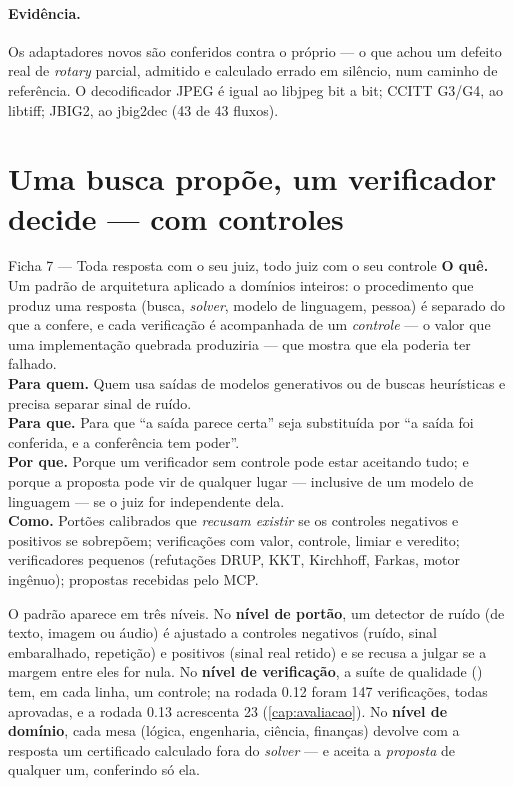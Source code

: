 \paragraph{Evidência.} Os adaptadores novos são conferidos contra o próprio  --- o que achou um defeito real de \textit{rotary} parcial, admitido e calculado errado em silêncio, num caminho de referência. O decodificador JPEG é igual ao libjpeg bit a bit; CCITT G3/G4, ao libtiff; JBIG2, ao jbig2dec (43 de 43 fluxos).

\section{Uma busca propõe, um verificador decide --- com controles}\label{sec:inov-proponente}

\begin{ficha}{Ficha 7 --- Toda resposta com o seu juiz, todo juiz com o seu controle}
\textbf{O quê.} Um padrão de arquitetura aplicado a domínios inteiros: o procedimento que produz uma resposta (busca, \textit{solver}, modelo de linguagem, pessoa) é separado do que a confere, e cada verificação é acompanhada de um \emph{controle} --- o valor que uma implementação quebrada produziria --- que mostra que ela poderia ter falhado.\\
\textbf{Para quem.} Quem usa saídas de modelos generativos ou de buscas heurísticas e precisa separar sinal de ruído.\\
\textbf{Para que.} Para que ``a saída parece certa'' seja substituída por ``a saída foi conferida, e a conferência tem poder''.\\
\textbf{Por que.} Porque um verificador sem controle pode estar aceitando tudo; e porque a proposta pode vir de qualquer lugar --- inclusive de um modelo de linguagem --- se o juiz for independente dela.\\
\textbf{Como.} Portões calibrados que \emph{recusam existir} se os controles negativos e positivos se sobrepõem; verificações com valor, controle, limiar e veredito; verificadores pequenos (refutações DRUP, KKT, Kirchhoff, Farkas, motor ingênuo); propostas recebidas pelo MCP.
\end{ficha}

O padrão aparece em três níveis. No \textbf{nível de portão}, um detector de ruído (de texto, imagem ou áudio) é ajustado a controles negativos (ruído, sinal embaralhado, repetição) e positivos (sinal real retido) e se recusa a julgar se a margem entre eles for nula. No \textbf{nível de verificação}, a suíte de qualidade () tem, em cada linha, um controle; na rodada 0.12 foram 147 verificações, todas aprovadas, e a rodada 0.13 acrescenta 23 (\autoref{cap:avaliacao}). No \textbf{nível de domínio}, cada mesa (lógica, engenharia, ciência, finanças) devolve com a resposta um certificado calculado fora do \textit{solver} --- e aceita a \emph{proposta} de qualquer um, conferindo só ela.

